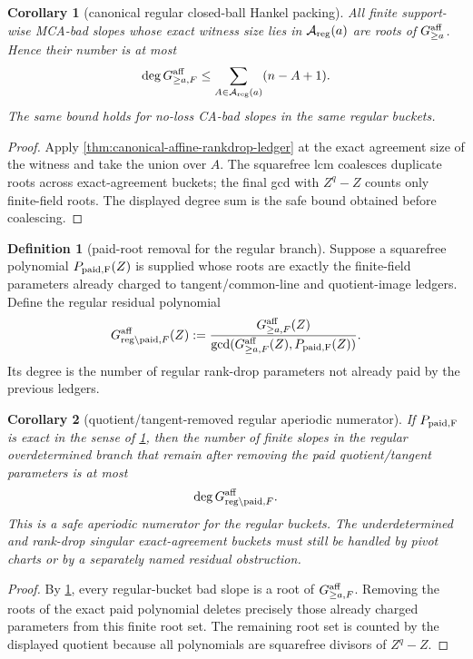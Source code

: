 \documentclass[11pt]{article}
\newtheorem{corollary}[corollary]{Corollary}
\theoremstyle{definition}
\newtheorem{definition}[definition]{Definition}
\theoremstyle{remark}
\begin{document}
\begin{corollary}[canonical regular closed-ball Hankel packing]
\label{cor:canonical-regular-closed-ball-hankel-packing}
All finite support-wise MCA-bad slopes whose exact witness size lies in
$\mathcal A_{\rm reg}(a)$ are roots of $G_{\ge a}^{\rm aff}$.  Hence their number
is at most
\[
        \deg G_{\ge a,F}^{\rm aff}
        \le \sum_{A\in\mathcal A_{\rm reg}(a)}(n-A+1).
\]
The same bound holds for no-loss CA-bad slopes in the same regular buckets.
\end{corollary}

\begin{proof}
Apply \cref{thm:canonical-affine-rankdrop-ledger} at the exact agreement size of
the witness and take the union over $A$.  The squarefree lcm coalesces duplicate
roots across exact-agreement buckets; the final gcd with $Z^q-Z$ counts only
finite-field roots.  The displayed degree sum is the safe bound obtained before
coalescing.
\end{proof}

\begin{definition}[paid-root removal for the regular branch]
\label{def:paid-root-removal-regular-branch}
Suppose a squarefree polynomial $P_{\rm paid,F}(Z)$ is supplied whose roots are
exactly the finite-field parameters already charged to tangent/common-line and
quotient-image ledgers.  Define the regular residual polynomial
\[
        G_{{\rm reg}\setminus{\rm paid},F}^{\rm aff}(Z)
        :=\frac{G_{\ge a,F}^{\rm aff}(Z)}
        {\gcd(G_{\ge a,F}^{\rm aff}(Z),P_{\rm paid,F}(Z))} .
\]
Its degree is the number of regular rank-drop parameters not already paid by the
previous ledgers.
\end{definition}

\begin{corollary}[quotient/tangent-removed regular aperiodic numerator]
\label{cor:quotient-tangent-removed-regular-numerator}
If $P_{\rm paid,F}$ is exact in the sense of
\cref{def:paid-root-removal-regular-branch}, then the number of finite slopes in
the regular overdetermined branch that remain after removing the paid
quotient/tangent parameters is at most
\[
        \deg G_{{\rm reg}\setminus{\rm paid},F}^{\rm aff} .
\]
This is a safe aperiodic numerator for the regular buckets.  The underdetermined
and rank-drop singular exact-agreement buckets must still be handled by pivot
charts or by a separately named residual obstruction.
\end{corollary}

\begin{proof}
By \cref{cor:canonical-regular-closed-ball-hankel-packing}, every regular-bucket
bad slope is a root of $G_{\ge a,F}^{\rm aff}$.  Removing the roots of the exact
paid polynomial deletes precisely those already charged parameters from this
finite root set.  The remaining root set is counted by the displayed quotient
because all polynomials are squarefree divisors of $Z^q-Z$.
\end{proof}
\end{document}

